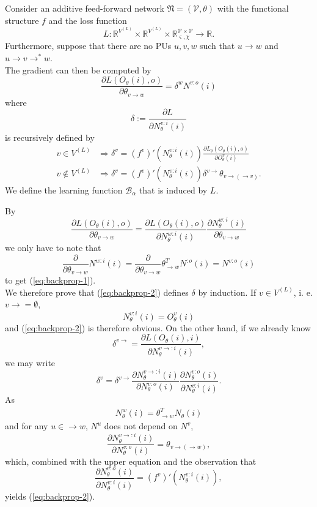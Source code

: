 \documentclass[a4paper,11pt]{report}
\newcommand{\const}{\varsigma} %
\newcommand{\var}{\chi} %
\begin{document}
\begin{The}[Backpropagation]\label{the:backpropagation}
Consider an additive feed-forward network $\mathfrak{N}=(\mathcal{V},\theta)$ with the functional structure $f$ and the loss function 
\begin{equation}
L:\mathbb{R}^{V^{(L)}}\times \mathbb{R}^{V^{(L)}}\times\mathbb{R}_{\const,\var}^{\mathcal{V}\times\mathcal{V}}\to\mathbb{R}.
\end{equation}
Furthermore, suppose that there are no PUs $u,v,w$ such that $u\to w$ and $u\to v\to^*w$.\\
The gradient can then be computed by
\begin{equation}\label{eq:backprop-1}
\frac{\partial L(O_{\theta}(i),o)}{\partial\theta_{v\to w}}=\delta^wN^{v:o}(i)
\end{equation}
where
\[
\delta:=\frac{\partial L}{\partial N^{v:i}_{\theta}(i)}
\]
is recursively defined by
\begin{equation}\label{eq:backprop-2}
\begin{aligned}
v\in V^{(L)}&\Rightarrow\delta^v=\left(f^v\right)'\left(N^{v:i}_{\theta}(i)\right)\frac{\partial L_{\theta}(O_{\theta}(i),o)}{\partial O_{\theta}^v(i)}\\
v\notin V^{(L)}&\Rightarrow\delta^v=\left(f^v\right)'\left(N^{v:i}_{\theta}(i)\right)\delta^{v\to}\theta_{v\to(\to v)}.
\end{aligned}
\end{equation}
We define the learning function $\mathcal{B}_{\alpha}$ that is induced by $L$.
\end{The}

\begin{Bew}
By
\[
\frac{\partial L(O_{\theta}(i),o)}{\partial\theta_{v\to w}}=\frac{\partial L(O_{\theta}(i),o)}{\partial N_{\theta}^{w:i}(i)}\frac{\partial N_{\theta}^{w:i}(i)}{\partial\theta_{v\to w}}
\]
we only have to note that
\[
\frac{\partial}{\partial\theta_{v\to w}}N^{w:i}(i)=\frac{\partial}{\partial\theta_{v\to w}}\theta^T_{\to w}N^{:o}(i)=N^{v:o}(i)
\]
to get (\ref{eq:backprop-1}).\\
We therefore prove that (\ref{eq:backprop-2}) defines $\delta$ by induction. If $v\in V^{(L)}$, i. e. $v\to=\emptyset$,
\[
N^{v:i}_{\theta}(i)=O^v_{\theta}(i)
\]
and (\ref{eq:backprop-2}) is therefore obvious. On the other hand, if we already know
\[
\delta^{v\to}=\frac{\partial L(O_{\theta}(i),i)}{\partial N^{v\to:i}_{\theta}(i)},
\]
we may write
\[
\delta^v=\delta^{v\to}\frac{\partial N^{v\to:i}_{\theta}(i)}{\partial N^{v:o}_{\theta}(i)}\frac{\partial N^{v:o}_{\theta}(i)}{\partial N^{v:i}_{\theta}(i)}.
\]
As
\begin{align*}
N^w_{\theta}(i)=\theta_{\to w}^TN_{\theta}(i)
\end{align*}
and for any $u\in\to w$, $N^u$ does not depend on $N^v$, 
\[
\frac{\partial N^{v\to:i}_{\theta}(i)}{\partial N^{v:o}_{\theta}(i)}=\theta_{v\to(\to w)},
\]
which, combined with the upper equation and the observation that
\[
\frac{\partial N^{v:o}_{\theta}(i)}{\partial N^{v:i}_{\theta}(i)}=\left(f^v\right)'(N^{v:i}_{\theta}(i)),
\]
yields (\ref{eq:backprop-2}).
\end{Bew}
\end{document}
